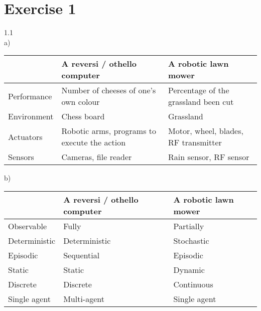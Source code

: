 \documentclass{article}
\begin{document}
\section*{Exercise 1}
1.1
\\
a)
\begin{center} %
\begin{tabular}{l|l|l|}
\cline{2-3}
                                  & \textbf{A reversi / othello computer}        & \textbf{A robotic lawn mower}             \\ \hline
\multicolumn{1}{|l|}{Performance} & Number of cheeses of one’s own colour        & Percentage of the grassland been cut \\ \hline
\multicolumn{1}{|l|}{Environment} & Chess board                                  & Grassland                                 \\ \hline
\multicolumn{1}{|l|}{Actuators}   & Robotic arms, programs to execute the action & Motor, wheel, blades, RF transmitter      \\ \hline
\multicolumn{1}{|l|}{Sensors}     & Cameras, file reader                         & Rain sensor, RF sensor                    \\ \hline
\end{tabular}
\end{center}
b)
\begin{center}
\begin{tabular}{l|l|l|}
\cline{2-3}
                                    & \textbf{A reversi / othello computer} & \textbf{A robotic lawn mower} \\ \hline
\multicolumn{1}{|l|}{Observable}    & Fully                                 & Partially                     \\ \hline
\multicolumn{1}{|l|}{Deterministic} & Deterministic                         & Stochastic                    \\ \hline
\multicolumn{1}{|l|}{Episodic}      & Sequential                            & Episodic                      \\ \hline
\multicolumn{1}{|l|}{Static}        & Static                                & Dynamic                       \\ \hline
\multicolumn{1}{|l|}{Discrete}      & Discrete                              & Continuous                    \\ \hline
\multicolumn{1}{|l|}{Single agent}  & Multi-agent                           & Single agent                  \\ \hline
\end{tabular}
\end{center}
\end{document}
